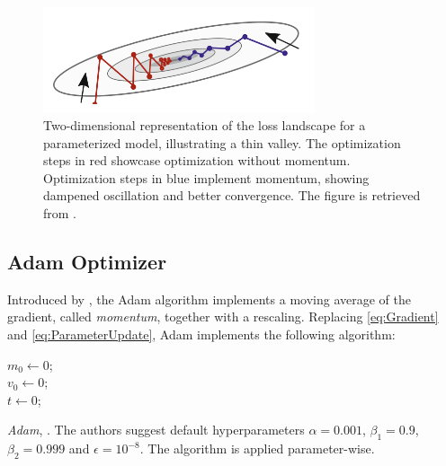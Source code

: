 \begin{figure}[htp]
    \centering
    \includegraphics[width=8cm]{latex/figures/thin_vally.png}
    \caption{Two-dimensional representation of the loss landscape for a parameterized model, illustrating a thin valley. The optimization steps in red showcase optimization without momentum. Optimization steps in blue implement momentum, showing dampened oscillation and better convergence. The figure is retrieved from \citet{SupervisedwquantumComputers}.}
    \label{fig:thinValley}
\end{figure}

\subsection{Adam Optimizer}\label{sec:AdamOptimizer}
Introduced by \citet{kingma2017adam}, the Adam algorithm implements a moving average of the gradient, called \emph{momentum}, together with a rescaling. Replacing \autoref{eq:Gradient} and \autoref{eq:ParameterUpdate}, Adam implements the following algorithm:

\begin{algorithm}[H]\label{alg:Adam}
\SetAlgoLined

$m_0 \gets 0$;\\
$v_0 \gets 0$;\\
$t \gets 0$;\\
\caption{\emph{Adam}, \cite{kingma2017adam}. The authors suggest default hyperparameters $\alpha = 0.001$, $\beta_1 = 0.9$, $\beta_2 = 0.999$ and $\epsilon = 10^{-8}$. The algorithm is applied parameter-wise.}
\end{algorithm}


